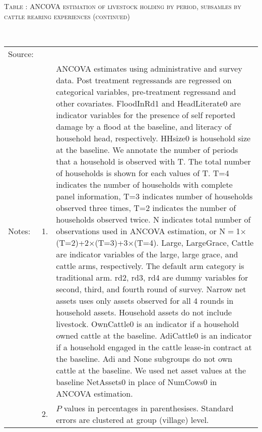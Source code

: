 \addtocounter{table}{-1}
\hspace{-1cm}\begin{minipage}[t]{14cm}
\hfil\textsc{\normalsize Table \thetable: ANCOVA estimation of livestock holding by period, subsamles by cattle rearing experiences (continued) \label{tab ANCOVA livestock holding Experience timevarying 2}}\\
\setlength{\tabcolsep}{1pt}
\setlength{\baselineskip}{8pt}
\renewcommand{\arraystretch}{.52}
\hfil{}\\
\renewcommand{\arraystretch}{.8}
\setlength{\tabcolsep}{1pt}
\begin{tabular}{>{\hfill\scriptsize}p{1cm}<{}>{\hfill\scriptsize}p{.25cm}<{}>{\scriptsize}p{12cm}<{\hfill}}
Source:& \multicolumn{2}{l}{\scriptsize Estimated with GUK administrative and survey data.}\\
Notes: & 1. & ANCOVA estimates using administrative and survey data. Post treatment regressands are regressed on categorical variables, pre-treatment regressand and other covariates. \textsf{FloodInRd1} and \textsf{HeadLiterate0} are indicator variables for the presence of self reported damage by a flood at the baseline, and literacy of household head, respectively. \textsf{HHsize0} is household size at the baseline. We annotate the number of periods that a household is observed with \textsf{T}. The total number of households is shown for each values of \textsf{T}. \textsf{T=4} indicates the number of households with complete panel information, \textsf{T=3} indicates number of households observed three times, \textsf{T=2} indicates the number of households observed twice. \textsf{N} indicates total number of observations used in ANCOVA estimation, or \textsf{N$=$1$\times$(T=2)+2$\times$(T=3)+3$\times$(T=4)}.  \textsf{Large}, \textsf{LargeGrace}, \textsf{Cattle} are indicator variables of the \textsf{large}, \textsf{large grace}, and \textsf{cattle} arms, respectively. The default arm category is \textsf{traditional} arm. \textsf{rd2, rd3, rd4} are dummy variables for second, third, and fourth round of survey. Narrow net assets uses only assets observed for all 4 rounds in household assets. Household assets do not include livestock. \textsf{OwnCattle0} is an indicator if a household owned cattle at the baseline. \textsf{AdiCattle0} is an indicator if a household engaged in the cattle lease-in contract at the baseline.  \textsf{Adi} and \textsf{None} subgroups do not own cattle at the baseline. We used net asset values at the baseline \textsf{NetAssets0} in place of \textsf{NumCows0} in ANCOVA estimation.\\
& 2. & $P$ values in percentages in parenthesises. Standard errors are clustered at group (village) level.
\end{tabular}
\end{minipage}

